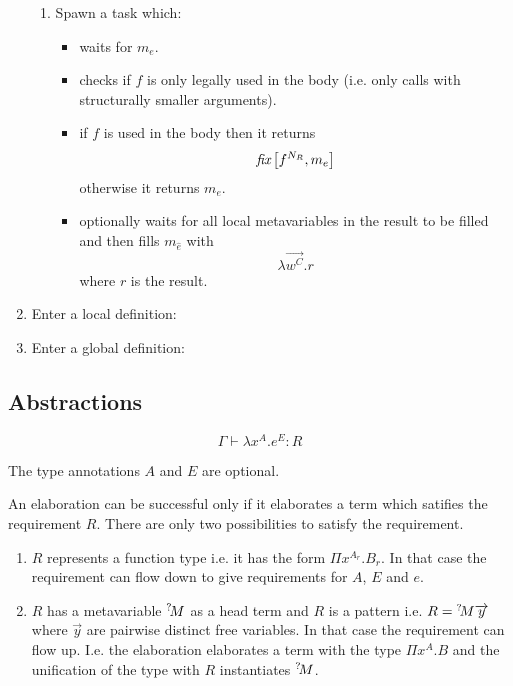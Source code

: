 \begin{enumerate}
\begin{enumerate}
            \item Spawn a task which:
                \begin{itemize}
                    \item waits for $m_e$.

                    \item checks if $f$ is only legally used in the body (i.e.
                        only calls with structurally smaller arguments).

                    \item if $f$ is used in the body then it returns
                        $$
                            {{\text{\it fix}} \left[ {f^{N_R}, m_e} \right]}
                        $$
                        otherwise it returns $m_e$.

                    \item optionally waits for all local
                        metavariables in the result to be filled and then fills
                        $m_{\hat e}$ with
                        $$
                            \lambda \vec {w^C}. r
                        $$
                        where $r$ is the result.
                \end{itemize}
        \end{enumerate}


    \item Enter a local definition:


    \item Enter a global definition:


\end{enumerate}








\subsection{Abstractions}

$$
\Gamma \vdash \lambda x^A. e^E : R
$$

The type annotations $A$ and $E$ are optional.

An elaboration can be successful only if it elaborates a term which satifies the
requirement $R$. There are only two possibilities to satisfy the requirement.

\begin{enumerate}
    \item $R$ represents a function type i.e. it has the form $\Pi x^{A_r}.
        B_r$. In that case the requirement can flow down to give requirements
        for $A$, $E$ and $e$.

    \item $R$ has a metavariable ${{}^? \kern-0.2em M}$ as a head term and $R$ is a pattern
        i.e. $R = {{}^? \kern-0.2em M} {\overrightarrow {y}}$ where $\vec y$ are pairwise distinct free
        variables. In that case the requirement can flow up. I.e. the
        elaboration elaborates a term with the type $\Pi x^A. B$ and the
        unification of the type with $R$ instantiates ${{}^? \kern-0.2em M}$.
\end{enumerate}


